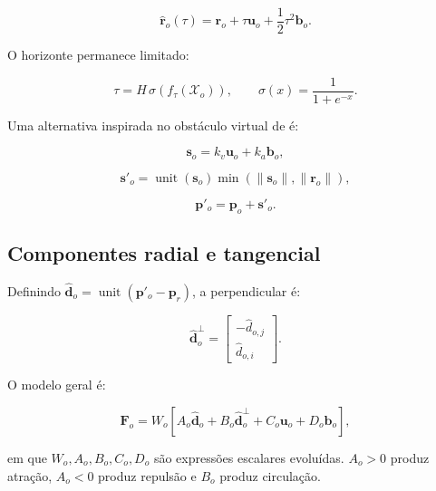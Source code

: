 \documentclass[12pt,a4paper]{article}
\newcommand{\vect}[1]{\boldsymbol{#1}}
\newcommand{\unit}[1]{\widehat{\vect{#1}}}
\begin{document}
\begin{equation}
  \widehat{\vect{r}}_o(\tau)
  =\vect{r}_o+\tau\vect{u}_o+\frac{1}{2}\tau^2\vect{b}_o.
\end{equation}

O horizonte permanece limitado:

\begin{equation}
  \tau=H\,\sigma(f_\tau(\mathcal{X}_o)),\qquad
  \sigma(x)=\frac{1}{1+e^{-x}}.
\end{equation}

Uma alternativa inspirada no obst\'aculo virtual de \citet{lim2008} \'e:

\begin{equation}
  \vect{s}_o=k_v\vect{u}_o+k_a\vect{b}_o,
\end{equation}

\begin{equation}
  \vect{s}'_o=\operatorname{unit}(\vect{s}_o)
  \min(\|\vect{s}_o\|,\|\vect{r}_o\|),
\end{equation}

\begin{equation}
  \vect{p}'_o=\vect{p}_o+\vect{s}'_o.
\end{equation}

\subsection{Componentes radial e tangencial}

Definindo $\unit{d}_o=\operatorname{unit}(\vect{p}'_o-\vect{p}_r)$, a perpendicular \'e:

\begin{equation}
  \unit{d}_o^{\perp}=\begin{bmatrix}-\widehat{d}_{o,j}\\\widehat{d}_{o,i}\end{bmatrix}.
\end{equation}

O modelo geral \'e:

\begin{equation}
  \vect{F}_o=W_o\left[A_o\unit{d}_o+B_o\unit{d}_o^\perp+C_o\vect{u}_o+D_o\vect{b}_o\right],
  \label{eq:ponto-geral}
\end{equation}

em que $W_o,A_o,B_o,C_o,D_o$ s\~ao express\~oes escalares evolu\'idas. $A_o>0$ produz atra\c{c}\~ao, $A_o<0$ produz repuls\~ao e $B_o$ produz circula\c{c}\~ao.

\end{document}
